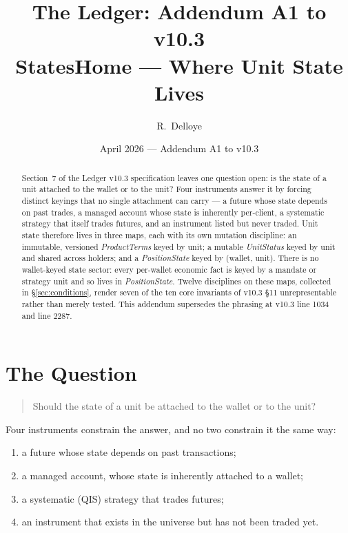 \documentclass[11pt,a4paper]{article}
\title{The Ledger: Addendum A1 to v10.3\\[6pt]
\large StatesHome --- Where Unit State Lives}
\author{R.\ Delloye}
\date{April 2026 --- Addendum A1 to v10.3}
\begin{document}
\maketitle

\begin{abstract}
Section~7 of the Ledger v10.3 specification leaves one question open: is the state of a
unit attached to the wallet or to the unit? Four instruments answer it by forcing distinct
keyings that no single attachment can carry --- a future whose state depends on past
trades, a managed account whose state is inherently per-client, a systematic strategy that
itself trades futures, and an instrument listed but never traded. Unit state therefore
lives in three maps, each with its own mutation discipline: an immutable, versioned
\emph{ProductTerms} keyed by unit; a mutable \emph{UnitStatus} keyed by unit and shared
across holders; and a \emph{PositionState} keyed by (wallet, unit). There is no
wallet-keyed state sector: every per-wallet economic fact is keyed by a mandate or strategy
unit and so lives in \emph{PositionState}. Twelve disciplines on these maps, collected in
\S\ref{sec:conditions}, render seven of the ten core invariants of v10.3 \S 11
unrepresentable rather than merely tested. This addendum supersedes the phrasing at v10.3
line 1034 and line 2287.
\end{abstract}

\tableofcontents
\clearpage

\section{The Question}
\label{sec:question}

\begin{quote}
Should the state of a unit be attached to the wallet or to the unit?
\end{quote}

\noindent Four instruments constrain the answer, and no two constrain it the same way:

\begin{enumerate}[leftmargin=*]
\item a future whose state depends on past transactions;
\item a managed account, whose state is inherently attached to a wallet;
\item a systematic (QIS) strategy that trades futures;
\item an instrument that exists in the universe but has not been traded yet.
\end{enumerate}
\end{document}
